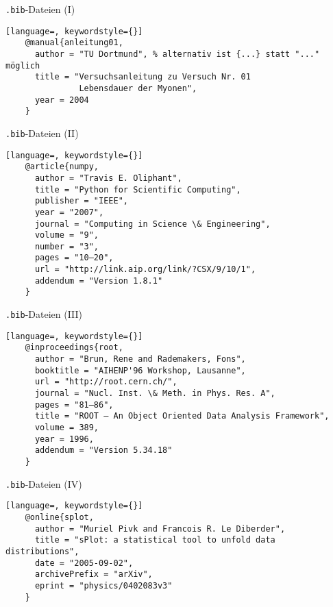 \begin{frame}[fragile]{\texttt{.bib}-Dateien (I)}
  \begin{lstlisting}[language=, keywordstyle={}]
    @manual{anleitung01,
      author = "TU Dortmund", % alternativ ist {...} statt "..." möglich
      title = "Versuchsanleitung zu Versuch Nr. 01
               Lebensdauer der Myonen",
      year = 2004
    }
  \end{lstlisting}
  \vspace{1em}
\end{frame}

\begin{frame}[fragile]{\texttt{.bib}-Dateien (II)}
  \begin{lstlisting}[language=, keywordstyle={}]
    @article{numpy,
      author = "Travis E. Oliphant",
      title = "Python for Scientific Computing",
      publisher = "IEEE",
      year = "2007",
      journal = "Computing in Science \& Engineering",
      volume = "9",
      number = "3",
      pages = "10–20",
      url = "http://link.aip.org/link/?CSX/9/10/1",
      addendum = "Version 1.8.1"
    }
  \end{lstlisting}
  \vspace{1em}
\end{frame}

\begin{frame}[fragile]{\texttt{.bib}-Dateien (III)}
  \begin{lstlisting}[language=, keywordstyle={}]
    @inproceedings{root,
      author = "Brun, Rene and Rademakers, Fons",
      booktitle = "AIHENP'96 Workshop, Lausanne",
      url = "http://root.cern.ch/",
      journal = "Nucl. Inst. \& Meth. in Phys. Res. A",
      pages = "81–86",
      title = "ROOT — An Object Oriented Data Analysis Framework",
      volume = 389,
      year = 1996,
      addendum = "Version 5.34.18"
    }
  \end{lstlisting}
  \vspace{1em}
\end{frame}

\begin{frame}[fragile]{\texttt{.bib}-Dateien (IV)}
  \begin{lstlisting}[language=, keywordstyle={}]
    @online{splot,
      author = "Muriel Pivk and Francois R. Le Diberder",
      title = "sPlot: a statistical tool to unfold data distributions",
      date = "2005-09-02",
      archivePrefix = "arXiv",
      eprint = "physics/0402083v3"
    }
  \end{lstlisting}
  \vspace{1em}
\end{frame}

